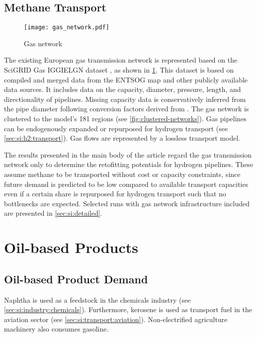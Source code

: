 \subsection{Methane Transport}
\label{sec:si:methane:transport}

\begin{figure}
    \texttt{[image: gas\_network.pdf]}
    \label{fig:gas-raw}
    \caption{Gas network}
\end{figure}

The existing European gas transmission network is represented based on the
SciGRID Gas IGGIELGN dataset , as shown in
\cref{fig:gas-raw}. This dataset is based on compiled and merged data from the
ENTSOG map \citeS{} and other publicly available data sources. It includes data
on the capacity, diameter, pressure, length, and directionality of pipelines.
Missing capacity data is conservatively inferred from the pipe diameter
following conversion factors derived from \cite{EuropeanHydrogen}. The gas
network is clustered to the model's 181 regions (see
\cref{fig:clustered-networks}). Gas pipelines can be endogenously expanded or
repurposed for hydrogen transport (see \cref{sec:si:h2:transport}). Gas flows
are represented by a lossless transport model.

The results presented in the main body of the article regard the gas
transmission network only to determine the retofitting potentials for hydrogen
pipelines. These assume methane to be transported without cost or capacity
constraints, since future demand is predicted to be low compared to available
transport capacities even if a certain share is repurposed for hydrogen
transport such that no bottlenecks are expected. Selected runs with gas network
infrastructure included are presented in \cref{sec:si:detailed}.

\section{Oil-based Products}
\label{sec:si:oil}

\subsection{Oil-based Product Demand}
\label{sec:si:demand}

Naphtha is used as a feedstock in the chemicals industry (see
\cref{sec:si:industry:chemicals}). Furthermore, kerosene is used as transport
fuel in the aviation sector (see \cref{sec:si:transport:aviation}).
Non-electrified agriculture machinery also consumes gasoline.

